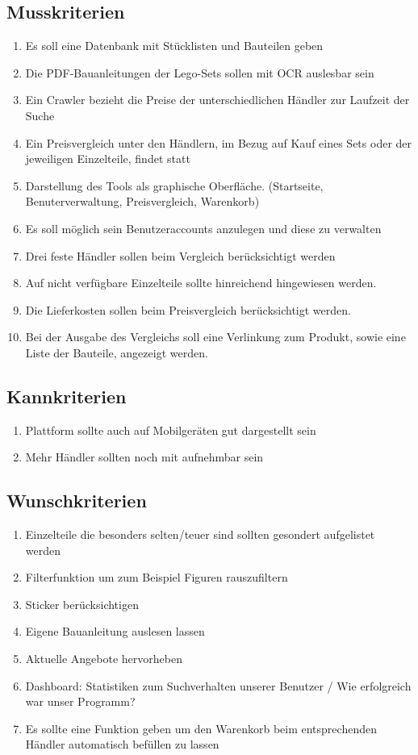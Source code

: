 \subsection{Musskriterien}
\begin{enumerate}
\item Es soll eine Datenbank mit Stücklisten und Bauteilen geben
\item Die PDF-Bauanleitungen der Lego-Sets sollen mit OCR auslesbar sein
\item Ein Crawler bezieht die Preise der unterschiedlichen Händler zur Laufzeit der Suche
\item  Ein Preisvergleich unter den Händlern, im Bezug auf Kauf eines Sets oder der jeweiligen Einzelteile, findet statt
\item Darstellung des Tools als graphische Oberfläche. (Startseite, Benuterverwaltung, Preisvergleich, Warenkorb)
\item Es soll möglich sein Benutzeraccounts anzulegen und diese zu verwalten
\item Drei feste Händler sollen beim Vergleich berücksichtigt werden
\item Auf nicht verfügbare Einzelteile sollte hinreichend hingewiesen werden.
\item Die Lieferkosten sollen beim Preisvergleich berücksichtigt werden.
\item Bei der Ausgabe des Vergleichs soll eine Verlinkung zum Produkt, sowie eine Liste der Bauteile, angezeigt werden.
\end{enumerate}

\subsection{Kannkriterien}
\begin{enumerate}
\item Plattform sollte auch auf Mobilgeräten gut dargestellt sein
\item Mehr Händler sollten noch mit aufnehmbar sein
\end{enumerate}

\subsection{Wunschkriterien}
\begin{enumerate}
\item Einzelteile die besonders selten/teuer sind sollten gesondert aufgelistet werden
\item Filterfunktion um zum Beispiel Figuren rauszufiltern
\item Sticker berücksichtigen
\item Eigene Bauanleitung auslesen lassen
\item Aktuelle Angebote hervorheben
\item Dashboard: Statistiken zum Suchverhalten unserer Benutzer / Wie erfolgreich war unser Programm?
\item Es sollte eine Funktion geben um den Warenkorb beim entsprechenden Händler automatisch befüllen zu lassen
\end{enumerate}

